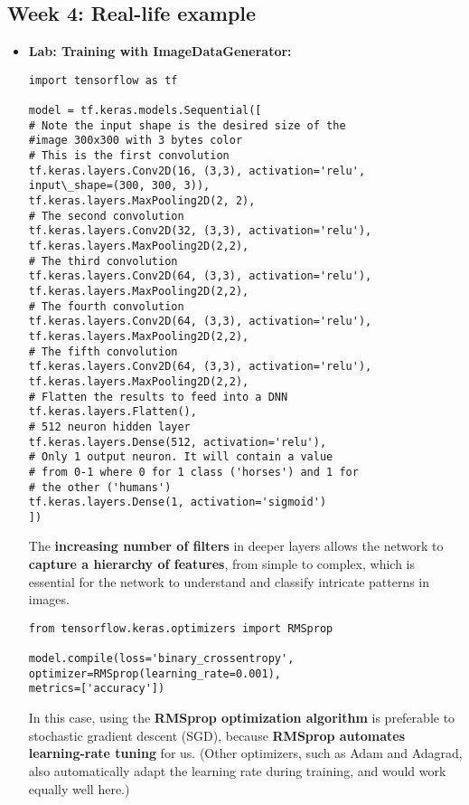 \documentclass[20pt]{article}
\begin{document}
	\subsection{Week 4: Real-life example}
	\begin{itemize}
		\item \textbf{Lab: Training with ImageDataGenerator:}
		\begin{verbatim}
import tensorflow as tf

model = tf.keras.models.Sequential([
# Note the input shape is the desired size of the 
#image 300x300 with 3 bytes color
# This is the first convolution
tf.keras.layers.Conv2D(16, (3,3), activation='relu',
input\_shape=(300, 300, 3)),
tf.keras.layers.MaxPooling2D(2, 2),
# The second convolution
tf.keras.layers.Conv2D(32, (3,3), activation='relu'),
tf.keras.layers.MaxPooling2D(2,2),
# The third convolution
tf.keras.layers.Conv2D(64, (3,3), activation='relu'),
tf.keras.layers.MaxPooling2D(2,2),
# The fourth convolution
tf.keras.layers.Conv2D(64, (3,3), activation='relu'),
tf.keras.layers.MaxPooling2D(2,2),
# The fifth convolution
tf.keras.layers.Conv2D(64, (3,3), activation='relu'),
tf.keras.layers.MaxPooling2D(2,2),
# Flatten the results to feed into a DNN
tf.keras.layers.Flatten(),
# 512 neuron hidden layer
tf.keras.layers.Dense(512, activation='relu'),
# Only 1 output neuron. It will contain a value
# from 0-1 where 0 for 1 class ('horses') and 1 for
# the other ('humans')
tf.keras.layers.Dense(1, activation='sigmoid')
])
		\end{verbatim}
		The \textbf{increasing number of filters} in deeper layers allows the network to \textbf{capture a hierarchy of features}, from simple to complex, which is essential for the network to understand and classify intricate patterns in images.
		\begin{verbatim}
from tensorflow.keras.optimizers import RMSprop
	
model.compile(loss='binary_crossentropy',
optimizer=RMSprop(learning_rate=0.001),
metrics=['accuracy'])
		\end{verbatim}
		In this case, using the \textbf{RMSprop optimization algorithm} is preferable to stochastic gradient descent (SGD), because \textbf{RMSprop automates learning-rate tuning} for us. (Other optimizers, such as Adam and Adagrad, also automatically adapt the learning rate during training, and would work equally well here.)
		
		
	\end{itemize}
	
	
\end{document}
